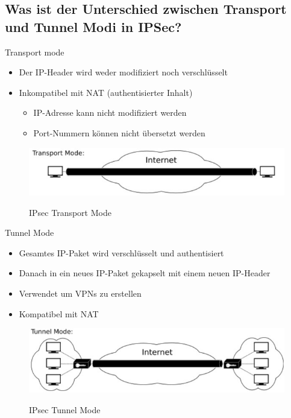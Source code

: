 \subsection*{Was ist der Unterschied zwischen Transport und Tunnel Modi in IPSec?}
Transport mode
\begin{itemize}
    \item Der IP-Header wird weder modifiziert noch verschlüsselt
    \item Inkompatibel mit NAT (authentisierter Inhalt)
    \begin{itemize}
        \item IP-Adresse kann nicht modifiziert werden
        \item Port-Nummern können nicht übersetzt werden
    \end{itemize}
\end{itemize}
\begin{figure}[H]
    \begin{center}
    \label{pic:IPsecTransportMode}
    \includegraphics[width=\textwidth]{images/ipsec_transport_mode.jpg}
    \caption{IPsec Transport Mode\cite{wiki}}
    \end{center}
\end{figure}

Tunnel Mode
\begin{itemize}
    \item Gesamtes IP-Paket wird verschlüsselt und authentisiert
    \item Danach in ein neues IP-Paket gekapselt mit einem neuen IP-Header
    \item Verwendet um VPNs zu erstellen
    \item Kompatibel mit NAT
\end{itemize}
\begin{figure}[H]
    \begin{center}
    \label{pic:IPsecTunnelMode}
    \includegraphics[width=\textwidth]{images/ipsec_tunnel_mode.jpg}
    \caption{IPsec Tunnel Mode\cite{wiki}}
    \end{center}
\end{figure}

